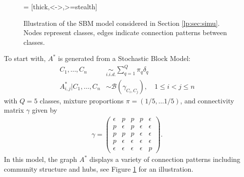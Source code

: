 \documentclass[a4paper, 11pt]{article}
\theoremstyle{remark}
\newcommand{\EM}{\ensuremath}
\newcommand{\cB}{\EM{\mathcal{B}}}
\begin{document}
\begin{figure}
 = [thick,<->,>=stealth]

\centering
{}
\caption{Illustration of the SBM model considered in Section \ref{lp:sec:simu}. Nodes represent classes, edges indicate connection patterns between classes. }
\label{lp:fig:sbm}
\end{figure}

To start with, $A^*$ is generated from a Stochastic Block Model:
\begin{align*}
C_1, \dots, C_n &\underset{i.i.d.}{\sim} \sum_{q=1}^Q \pi_q \delta_q \\
A^*_{i,j} \vert C_1, \dots, C_n &\sim \cB \left( \gamma_{C_i, C_j} \right), \quad 1 \leq i < j \leq n 
\end{align*}
with $Q=5$ classes, mixture proportions $\pi = (1/5, \dots 1/5)$, and connectivity matrix $\gamma$ given by
\begin{align*}
\gamma = 
\begin{pmatrix}
\epsilon &p &p &p & \epsilon \\
p & \epsilon & p & \epsilon & \epsilon \\
p &p &p &\epsilon & \epsilon \\
p &\epsilon &\epsilon &\epsilon &\epsilon \\
\epsilon &\epsilon &\epsilon &\epsilon &p 
\end{pmatrix}.
\end{align*}
In this model, the graph $A^*$ displays a variety of connection patterns including community structure and hubs, see Figure \ref{lp:fig:sbm} for an illustration. 
\end{document}
